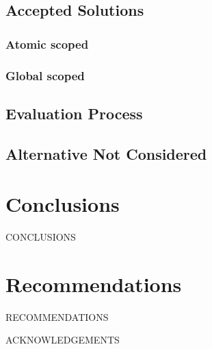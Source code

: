 \documentclass[12pt]{article}
\begin{document}
\subsection{Accepted Solutions}
\subsubsection{Atomic scoped}


\subsubsection{Global scoped}

\subsection{Evaluation Process}
\subsection{Alternative Not Considered}
\section{Conclusions}
CONCLUSIONS


\section{Recommendations}
RECOMMENDATIONS


\newpage



\newpage


ACKNOWLEDGEMENTS
\newpage


\end{document}
